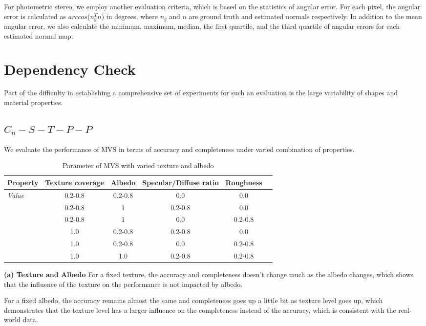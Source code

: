 For photometric stereo, we employ another evaluation criteria, which is based on the statistics of angular error. For each pixel, the angular error is calculated as $arccos$($n_g^T n$) in degrees, where $n_g$ and $n$ are ground truth and estimated normals respectively. In addition to the mean angular error, we also calculate the minimum, maximum, median, the first quartile, and the third quartile of angular errors for each estimated normal map.

\section{Dependency Check}
Part of the difficulty in establishing a comprehensive set of experiments for such an evaluation is the large variability of shapes and material properties.

\subsection{$C_n-S-T-P-P$}
We evaluate the performance of MVS in terms of accuracy and completeness under varied combination of properties.
\begin{table}[h]
  \centering
  \begin{tabular}{l*{5}{c}}
  \hline
  \textbf{Property} & Texture coverage & Albedo & Specular/Diffuse ratio & Roughness\\
  \hline
  \textit{Value} & 0.2-0.8 & 0.2-0.8 & 0.0 & 0.0\\
                 & 0.2-0.8 & 1 & 0.2-0.8 & 0.0\\
                 & 0.2-0.8 & 1 & 0.0 & 0.2-0.8\\
                 & 1.0 & 0.2-0.8 & 0.2-0.8 & 0.0\\
                 & 1.0 & 0.2-0.8 & 0.0 & 0.2-0.8\\
                 & 1.0 & 1.0 & 0.2-0.8 & 0.2-0.8\\
  \hline
  \end{tabular}
  \caption{Parameter of MVS with varied texture and albedo}
\end{table}

\textbf{(a) Texture and Albedo} 
For a fixed texture, the accuracy and completeness doesn't change much as the albedo changes, which shows that the influence of the texture on the performance is not impacted by albedo.

For a fixed albedo, the accuracy remains almost the same and completeness goes up a little bit as texture level goes up, which demonstrates that the texture level has a larger influence on the completeness instead of the accuracy, which is consistent with the real-world data.

